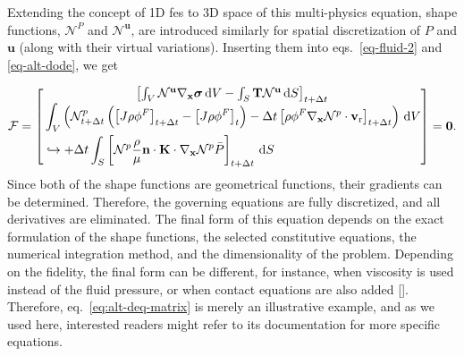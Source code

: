 \documentclass[12pt,a4paper]{report}
\begin{document}
Extending the concept of 1D \acp{fe} to 3D space of this multi-physics equation, shape functions, \( \mathcal{N}^P \) and \( \mathcal{N}^\mathbf{u} \), are introduced similarly for spatial discretization of \( P \) and \( \mathbf{u} \) (along with their virtual variations). Inserting them into eqs.~\ref{eq-fluid-2} and \ref{eq-alt-dode}, we get

%
\begin{equation}
    \mathcal{F} =
    \begin{bmatrix}
        \left[\int_V \mathcal{N}^\textbf{u} \nabla_\textbf{x} \boldsymbol{\sigma} \, {\mathrm d}V - \int_S \textbf{T} \mathcal{N}^\textbf{u} \, {\mathrm d}S\right]_{t+\Delta t} \\
        \begin{aligned}
            &\int_V \left ( \mathcal{N}^p_{t+\Delta t} \left( \left[ J \rho \phi^F \right]_{t+\Delta t} - \left[ J \rho \phi^F \right]_{t} \right) - \Delta t \left[ \rho \phi^F \nabla_{\mathbf{x}} \mathcal{N}^p \cdot \mathbf{v}_{\rm r} \right]_{t+\Delta t} \right) \, {\mathrm d}V \\
            &\hookrightarrow + \Delta t \int_S \left[ \mathcal{N}^p \frac{\rho}{\mu } \mathbf{n} \cdot \mathbf{K} \cdot \nabla_\mathbf{x} \mathcal{N}^p \bar{P} \right]_{t+\Delta t} \, {\mathrm d}S
        \end{aligned}
    \end{bmatrix}
    = \textbf{0}.
    \label{eq:alt-deq-matrix}
\end{equation}
%
Since both of the shape functions are geometrical functions, their gradients can be determined. Therefore, the governing equations are fully discretized, and all derivatives are eliminated. The final form of this equation depends on the exact formulation of the shape functions, the selected constitutive equations, the numerical integration method, and the dimensionality of the problem. Depending on the fidelity, the final form can be different, for instance, when viscosity is used instead of the fluid pressure, or when contact equations are also added [\cite{pore2021,orava2022,orozco2022,oleg2023}]. Therefore, eq.~\ref{eq:alt-deq-matrix} is merely an illustrative example, and as we used \cite{abaqus} here, interested readers might refer to its documentation for more specific equations.
\end{document}
